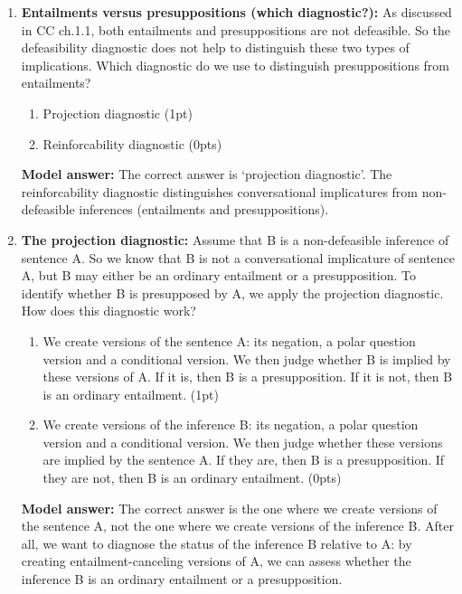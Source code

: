 \documentclass[a4,11pt]{article}
\begin{document}
\begin{enumerate}[leftmargin = 12pt]
 \item {\bf Entailments versus presuppositions (which diagnostic?):} As discussed in CC ch.1.1, both entailments and presuppositions are not defeasible. So the defeasibility diagnostic does not help to distinguish these two types of implications. Which diagnostic do we use to distinguish presuppositions from entailments?

   \begin{enumerate}[noitemsep]
        \item Projection diagnostic (1pt)
        \item Reinforcability diagnostic (0pts)
    \end{enumerate}
    
  {\bf Model answer:}  The correct answer is  `projection diagnostic'. The reinforcability diagnostic distinguishes conversational implicatures from non-defeasible inferences (entailments and presuppositions).
    
 \item {\bf The projection diagnostic:}  Assume that B is a non-defeasible inference of sentence A. So we know that B is not a conversational implicature of sentence A, but B may either be an ordinary entailment or a presupposition. To identify whether B is presupposed by A, we apply the projection diagnostic. How does this diagnostic work?
 
    \begin{enumerate}[noitemsep]

        \item We create versions of the sentence A: its negation, a polar question version and a conditional version. We then judge whether B is implied by these versions of A. If it is, then B is a presupposition. If it is not, then B is an ordinary entailment. (1pt)

\item We create versions of the inference B: its negation, a polar question version and a conditional version. We then judge whether these versions are implied by the sentence A. If they are, then B is a presupposition. If they are not, then B is an ordinary entailment. (0pts)

    \end{enumerate}

  {\bf Model answer:}  The correct answer is the one where we create versions of the sentence A, not the one where we create versions of the inference B. After all, we want to diagnose the status of the inference B relative to A: by creating entailment-canceling versions of A, we can assess whether the inference B is an ordinary entailment or a presupposition. 
 

\end{enumerate}
\end{document}
